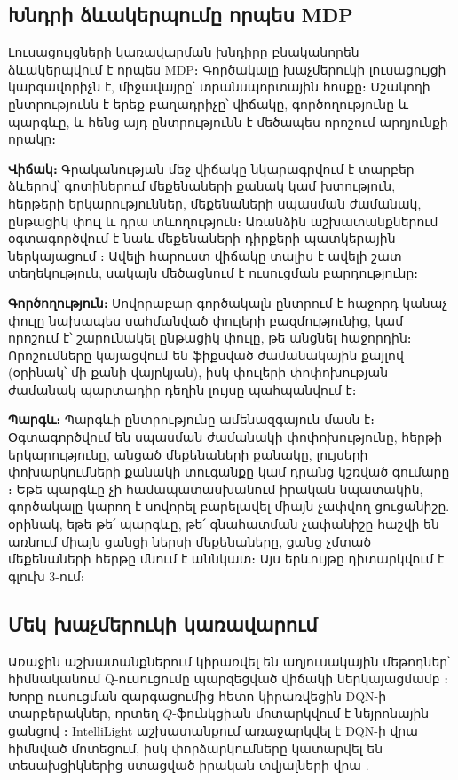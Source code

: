 \documentclass[12pt,a4paper]{extreport}
\begin{document}
\subsection{Խնդրի ձևակերպումը որպես MDP}

Լուսացույցների կառավարման խնդիրը բնականորեն ձևակերպվում է որպես MDP։ Գործակալը խաչմերուկի լուսացույցի կարգավորիչն է, միջավայրը՝ տրանսպորտային հոսքը։ Մշակողի ընտրությունն է երեք բաղադրիչը՝ վիճակը, գործողությունը և պարգևը, և հենց այդ ընտրությունն է մեծապես որոշում արդյունքի որակը։

\textbf{Վիճակ։} Գրականության մեջ վիճակը նկարագրվում է տարբեր ձևերով՝ գոտիներում մեքենաների քանակ կամ խտություն, հերթերի երկարություններ, մեքենաների սպասման ժամանակ, ընթացիկ փուլ և դրա տևողություն։ Առանձին աշխատանքներում օգտագործվում է նաև մեքենաների դիրքերի պատկերային ներկայացում \cite{intellilight2018}։ Ավելի հարուստ վիճակը տալիս է ավելի շատ տեղեկություն, սակայն մեծացնում է ուսուցման բարդությունը։

\textbf{Գործողություն։} Սովորաբար գործակալն ընտրում է հաջորդ կանաչ փուլը նախապես սահմանված փուլերի բազմությունից, կամ որոշում է՝ շարունակել ընթացիկ փուլը, թե անցնել հաջորդին։ Որոշումները կայացվում են ֆիքսված ժամանակային քայլով (օրինակ՝ մի քանի վայրկյան), իսկ փուլերի փոփոխության ժամանակ պարտադիր դեղին լույսը պահպանվում է։

\textbf{Պարգև։} Պարգևի ընտրությունը ամենազգայուն մասն է։ Օգտագործվում են սպասման ժամանակի փոփոխությունը, հերթի երկարությունը, անցած մեքենաների քանակը, լույսերի փոխարկումների քանակի տուգանքը կամ դրանց կշռված գումարը \cite{intellilight2018,presslight2019}։ Եթե պարգևը չի համապատասխանում իրական նպատակին, գործակալը կարող է սովորել բարելավել միայն չափվող ցուցանիշը. օրինակ, եթե թե՛ պարգևը, թե՛ գնահատման չափանիշը հաշվի են առնում միայն ցանցի ներսի մեքենաները, ցանց չմտած մեքենաների հերթը մնում է աննկատ։ Այս երևույթը դիտարկվում է գլուխ 3-ում։

\subsection{Մեկ խաչմերուկի կառավարում}

Առաջին աշխատանքներում կիրառվել են աղյուսակային մեթոդներ՝ հիմնականում Q-ուսուցումը պարզեցված վիճակի ներկայացմամբ \cite{wiering2000,abdulhai2003}։ Խորը ուսուցման զարգացումից հետո կիրառվեցին DQN-ի տարբերակներ, որտեղ $Q$-ֆունկցիան մոտարկվում է նեյրոնային ցանցով \cite{genders2016,pol2016}։ IntelliLight աշխատանքում առաջարկվել է DQN-ի վրա հիմնված մոտեցում, իսկ փորձարկումները կատարվել են տեսախցիկներից ստացված իրական տվյալների վրա \cite{intellilight2018}.
\end{document}
